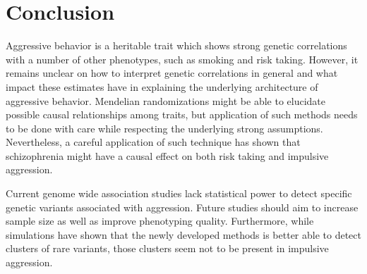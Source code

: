 \section{Conclusion}
\label{sec:conclusion}

Aggressive behavior is a heritable trait which shows strong genetic correlations with a number of other phenotypes, such as smoking and risk taking.
However, it remains unclear on how to interpret genetic correlations in general and what impact these estimates have in explaining the underlying architecture of aggressive behavior.
Mendelian randomizations might be able to elucidate possible causal relationships among traits, but application of such methods needs to be done with care while respecting the underlying strong assumptions. 
Nevertheless, a careful application of such technique has shown that schizophrenia might have a causal effect on both risk taking and impulsive aggression.

Current genome wide association studies lack statistical power to detect specific genetic variants associated with aggression.
Future studies should aim to increase sample size as well as improve phenotyping quality.
Furthermore, while simulations have shown that the newly developed methods is better able to detect clusters of rare variants, those clusters seem not to be present in impulsive aggression.
